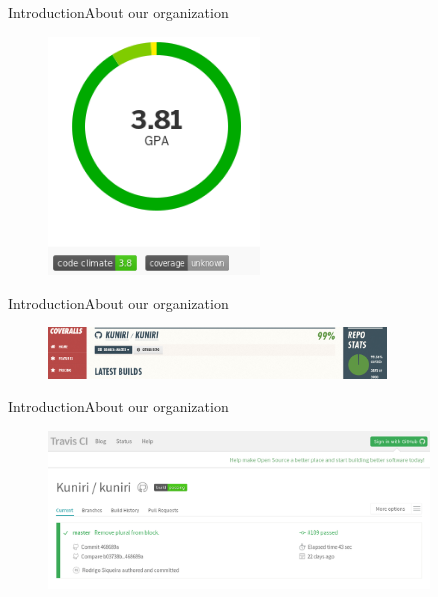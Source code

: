 \documentclass[10pt]{beamer}
\begin{document}
\begin{frame}{Introduction}{About our organization}
  \begin{figure}[overview]
    \includegraphics[width=0.5\textwidth]{images/codeclimate.png}
  \end{figure}
\end{frame}

\begin{frame}{Introduction}{About our organization}
  \begin{figure}[overview]
    \includegraphics[width=0.8\textwidth]{images/coveralls.png}
  \end{figure}
\end{frame}

\begin{frame}{Introduction}{About our organization}
  \begin{figure}[overview]
    \includegraphics[width=0.9\textwidth]{images/travisci.png}
  \end{figure}
\end{frame}
\end{document}

